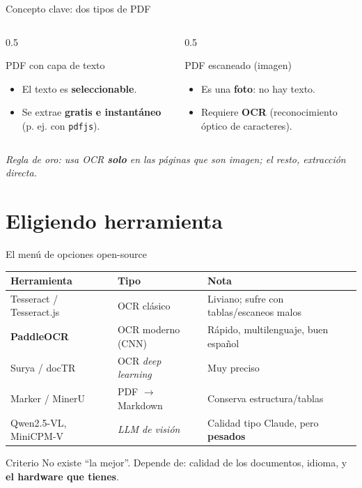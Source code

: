 \documentclass[10pt,aspectratio=169]{beamer}
\begin{document}
\begin{frame}{Concepto clave: dos tipos de PDF}
  \begin{columns}
    \begin{column}{0.5\textwidth}
      \begin{block}{PDF con capa de texto}
        \begin{itemize}
          \item El texto es \textbf{seleccionable}.
          \item Se extrae \textbf{gratis e instantáneo} (p. ej. con \texttt{pdfjs}).
        \end{itemize}
      \end{block}
    \end{column}
    \begin{column}{0.5\textwidth}
      \begin{block}{PDF escaneado (imagen)}
        \begin{itemize}
          \item Es una \textbf{foto}: no hay texto.
          \item Requiere \textbf{OCR} (reconocimiento óptico de caracteres).
        \end{itemize}
      \end{block}
    \end{column}
  \end{columns}
  \vfill
  \centering\footnotesize
  \emph{Regla de oro: usa OCR \textbf{solo} en las páginas que son imagen; el resto, extracción directa.}
\end{frame}

\section{Eligiendo herramienta}

\begin{frame}{El menú de opciones open-source}
  \centering
  \begin{tabular}{@{}lll@{}}
    \toprule
    \textbf{Herramienta} & \textbf{Tipo} & \textbf{Nota} \\
    \midrule
    Tesseract / Tesseract.js & OCR clásico & Liviano; sufre con tablas/escaneos malos \\
    \textbf{PaddleOCR} & OCR moderno (CNN) & Rápido, multilenguaje, buen español \\
    Surya / docTR & OCR \emph{deep learning} & Muy preciso \\
    Marker / MinerU & PDF $\rightarrow$ Markdown & Conserva estructura/tablas \\
    Qwen2.5-VL, MiniCPM-V & \emph{LLM de visión} & Calidad tipo Claude, pero \textbf{pesados} \\
    \bottomrule
  \end{tabular}
  \vfill
  \begin{block}{Criterio}
    No existe ``la mejor''. Depende de: calidad de los documentos, idioma, y \textbf{el hardware que tienes}.
  \end{block}
\end{frame}
\end{document}
